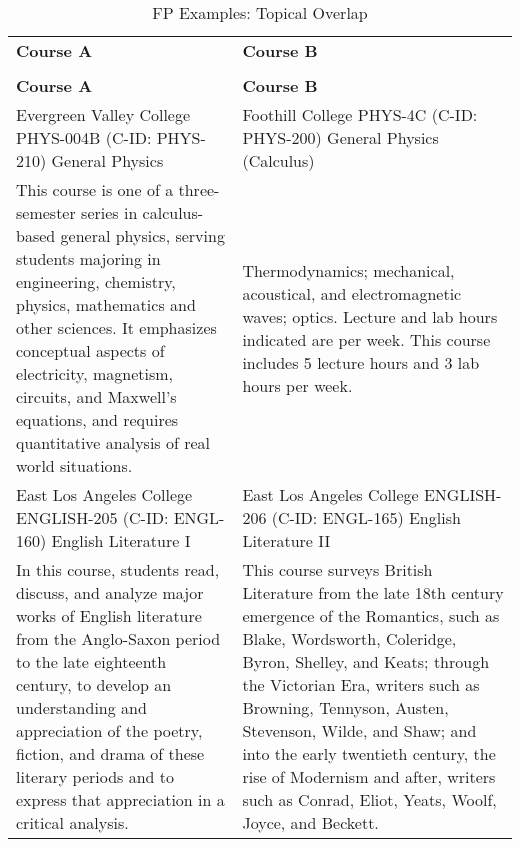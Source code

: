\begin{longtable}{ >{\baselineskip=12pt}p{} >{\baselineskip=12pt}p{} }
\captionsetup{skip=5pt}
\caption{FP Examples: Topical Overlap}\label{tab:fp_overlap_topic}\\
\bottomrule\toprule
\textbf{\textbf{Course A}} & \textbf{\textbf{Course B}} \\
\bottomrule\toprule
\endfirsthead
\caption[]{FP Examples: Topical Overlap}\\
\bottomrule\toprule
\textbf{\textbf{Course A}} & \textbf{\textbf{Course B}} \\
\bottomrule\toprule
\endhead
Evergreen Valley College \newline PHYS-004B (C-ID: PHYS-210) \newline General Physics & Foothill College \newline PHYS-4C (C-ID: PHYS-200) \newline General Physics (Calculus) \\
\midrule
This course is one of a three-semester series in calculus-based general physics, serving students majoring in engineering, chemistry, physics, mathematics and other sciences. It emphasizes conceptual aspects of electricity, magnetism, circuits, and Maxwell's equations, and requires quantitative analysis of real world situations. & Thermodynamics; mechanical, acoustical, and electromagnetic waves; optics. Lecture and lab hours indicated are per week. This course includes 5 lecture hours and 3 lab hours per week. \\
\bottomrule\toprule
East Los Angeles College \newline ENGLISH-205 (C-ID: ENGL-160) \newline English Literature I & East Los Angeles College \newline ENGLISH-206 (C-ID: ENGL-165) \newline English Literature II \\
\midrule
In this course, students read, discuss, and analyze major works of English literature from the Anglo-Saxon period to the late eighteenth century, to develop an understanding and appreciation of the poetry, fiction, and drama of these literary periods and to express that appreciation in a critical analysis. & This course surveys British Literature from the late 18th century emergence of the Romantics, such as Blake, Wordsworth, Coleridge, Byron, Shelley, and Keats; through the Victorian Era, writers such as Browning, Tennyson, Austen, Stevenson, Wilde, and Shaw; and into the early twentieth century, the rise of Modernism and after, writers such as Conrad, Eliot, Yeats, Woolf, Joyce, and Beckett. \\

\end{longtable}
